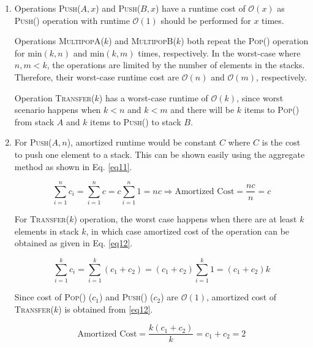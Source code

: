 \begin{enumerate}[label=(\alph*)]
\item Operations \textsc{Push}($A,x$) and \textsc{Push}($B,x$) have a runtime cost of $\mathcal{O}(x)$ as \textsc{Push}() operation with runtime $\mathcal{O}(1)$ should be performed for $x$ times.

Operations \textsc{MultipopA}($k$) and \textsc{MultipopB}($k$) both repeat the \textsc{Pop()} operation for $\text{min}(k,n)$ and $\text{min}(k,m)$ times, respectively. In the worst-case where $n,m < k$, the operations are limited by the number of elements in the stacks. Therefore, their worst-case runtime cost are $\mathcal{O}(n)$ and $\mathcal{O}(m)$, respectively.

Operation \textsc{Transfer($k$)} has a worst-case runtime of $\mathcal{O}(k)$, since worst scenario happens when $k < n$ and $k < m$ and there will be $k$ items to \textsc{Pop()} from stack $A$ and $k$ items to \textsc{Push()} to stack $B$.

\item For \textsc{Push}($A,n$), amortized runtime would be constant $C$ where $C$ is the cost to push one element to a stack. This can be shown easily using the aggregate method as shown in Eq. \ref{eq11}.

\begin{equation}
\sum_{i=1}^{n} c_i = \sum_{i=1}^{n} c = c \sum_{i=1}^{n} 1 = nc \Rightarrow \text{Amortized Cost} = \frac{nc}{n} = c
\label{eq11}
\end{equation}

For \textsc{Transfer($k$)} operation, the worst case happens when there are at least $k$ elements in stack $k$, in which case amortized cost of the operation can be obtained as given in Eq. \ref{eq12}.

\begin{equation}
\sum_{i=1}^{k} c_i = \sum_{i=1}^{k}(c_1 + c_2) = (c_1 + c_2) \sum_{i=1}^{k} 1 = (c_1 + c_2) k
\label{eq12}
\end{equation}

Since cost of \textsc{Pop()} ($c_1$) and \textsc{Push()} ($c_2$) are $\mathcal{O}(1)$, amortized cost of \textsc{Transfer($k$)} is obtained from \ref{eq12}.

\begin{equation}
\text{Amortized Cost} = \frac{k(c_1 + c_2)}{k} = c_1 + c_2 = 2
\end{equation}

\end{enumerate}

